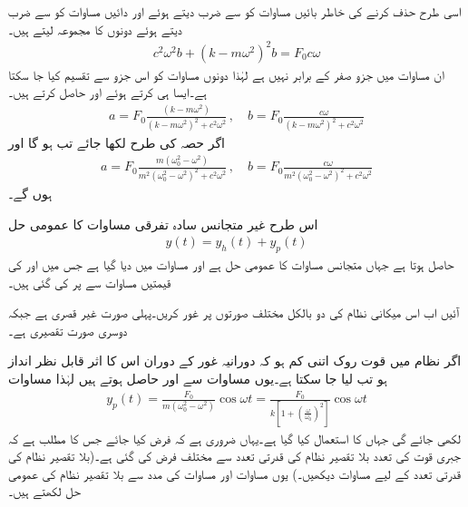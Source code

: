 اسی طرح  حذف کرنے کی خاطر بائیں مساوات کو  سے ضرب دیتے ہوئے اور دائیں مساوات کو  سے ضرب دیتے ہوئے دونوں کا مجموعہ لیتے ہیں۔
\begin{align*}
c^2\omega^2 b+(k-m\omega^2)^2b=F_0c\omega
\end{align*}
ان مساوات میں جزو  صفر کے برابر نہیں ہے لہٰذا دونوں مساوات کو اس جزو سے تقسیم کیا جا سکتا ہے۔ایسا ہی کرتے ہوئے  اور  حاصل کرتے ہیں۔
\begin{align*}
a=F_0\frac{(k-m\omega^2)}{(k-m\omega^2)^2+c^2\omega^2}\, , \quad b=F_0\frac{c\omega}{(k-m\omega^2)^2+c^2\omega^2}
\end{align*}
اگر حصہ  کی طرح  لکھا جائے تب  ہو گا اور 
\begin{align}\label{مساوات_سادہ_دو_نا_معلوم_عددی_سر_الف}
a=F_0\frac{m(\omega_0^2-\omega^2)}{m^2(\omega_0^2-\omega^2)^2+c^2\omega^2}\, , \quad b=F_0\frac{c\omega}{m^2(\omega_0^2-\omega^2)^2+c^2\omega^2}
\end{align}
ہوں گے۔

اس طرح غیر متجانس سادہ تفرقی مساوات  کا عمومی حل
\begin{align}\label{مساوات_سادہ_دو_نا_معلوم_عددی_سر_ب}
y(t)=y_h(t)+y_p(t)
\end{align}
حاصل ہوتا ہے جہاں  متجانس مساوات  کا عمومی حل ہے اور  مساوات  میں دیا گیا ہے جس میں  اور  کی قیمتیں مساوات  سے پر کی گئی ہیں۔

آئیں اب اس میکانی نظام کی دو بالکل مختلف صورتوں پر غور کریں۔پہلی صورت  غیر قصری ہے جبکہ دوسری صورت  تقصیری ہے۔

اگر نظام میں قوت روک اتنی کم ہو کہ دورانیہ غور کے دوران اس کا اثر قابل نظر انداز ہو تب  لیا جا سکتا ہے۔یوں مساوات  سے  اور  حاصل ہوتے ہیں لہٰذا مساوات 
\begin{align}\label{مساوات_سادہ_دو_بلا_تقصیر_حل_الف}
y_p(t)=\frac{F_0}{m(\omega_0^2-\omega^2)}\cos \omega t=\frac{F_0}{k[1+\left(\frac{\omega}{\omega_0}\right)^2]}\cos \omega t
\end{align}
لکھی جائے گی جہاں  کا استعمال کیا گیا ہے۔یہاں ضروری ہے کہ  فرض کیا جائے جس کا مطلب ہے کہ جبری قوت کی تعدد  بلا تقصیر نظام کی قدرتی تعدد  سے مختلف فرض کی گئی ہے۔(بلا تقصیر نظام کی قدرتی تعدد کے لیے  مساوات  دیکھیں۔) یوں مساوات   اور مساوات  کی مدد سے بلا تقصیر نظام کی عمومی حل لکھتے ہیں۔

